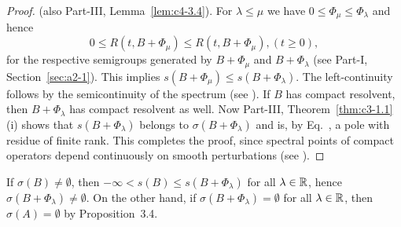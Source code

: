 \begin{proof} (\cf also Part-III, Lemma~\ref{lem:c4-3.4}). 
For $\lambda \leq \mu$ we have $0 \leq \Phi_\mu \leq \Phi_\lambda$ and hence 
\[
0 \leq R(t, B +\Phi_\mu) \leq R(t,B+\Phi_\mu) , (t\geq 0) , 
\]
for the respective semigroups generated by $B + \Phi_\mu$ and $B + \Phi_\lambda$ (see Part-I, Section~\ref{sec:a2-1}). 
This implies $s(B + \Phi_\mu) \leq s(B + \Phi_\lambda)$. 
The left-continuity follows by the semicontinuity of the spectrum (see \textcite[Chapter~IV, Theorem~3.1]{kato:1976}). 
If\/ $B$ has compact resolvent, then $B + \Phi_\lambda$ has compact resolvent as well. 
Now Part-III, Theorem~\ref{thm:c3-1.1}\,(i) shows that $s(B + \Phi_\lambda)$ belongs to $\sigma(B + \Phi_\lambda)$ and is, by Eq.~, a pole with residue of finite rank. 
This completes the proof, since spectral points of compact operators depend continuously on smooth perturbations (see \textcite[VII,6.Theorem~9]{dunfordschwartz:1958}).
\end{proof}
If\/ $\sigma(B) \neq \emptyset$, then $-\infty < s(B) \leq s(B + \Phi_\lambda)$ for all $\lambda \in \mathbb{R}$, 
hence $\sigma(B + \Phi_\lambda) \neq \emptyset$. 
On the other hand, if\/ $\sigma(B + \Phi_\lambda) = \emptyset$ for all $\lambda \in \mathbb{R}$,  then $\sigma(A) = \emptyset$ by Proposition~3.4.

